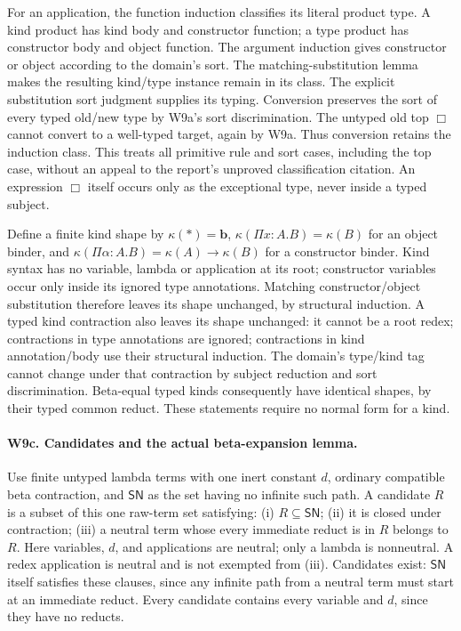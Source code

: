 For an application, the function induction classifies its literal
product type. A kind product has kind body and constructor function;
a type product has constructor body and object function. The argument
induction gives constructor or object according to the domain's sort.
The matching-substitution lemma makes the resulting kind/type instance
remain in its class. The explicit substitution sort judgment supplies
its typing. Conversion preserves the sort of every typed old/new type
by W9a's sort discrimination. The untyped old top \(\Box\) cannot
convert to a well-typed target, again by W9a. Thus conversion retains
the induction class. This treats all primitive rule and sort cases,
including the top case, without an appeal to the report's unproved
classification citation. An expression \(\Box\) itself occurs only
as the exceptional type, never inside a typed subject.

Define a finite kind shape by
\(\kappa(\ast)=\mathbf b\),
\(\kappa(\Pi x:A.B)=\kappa(B)\) for an object binder, and
\(\kappa(\Pi\alpha:A.B)=\kappa(A)\to\kappa(B)\) for a constructor
binder. Kind syntax has no variable, lambda or application at its root;
constructor variables occur only inside its ignored type annotations.
Matching constructor/object substitution therefore leaves its shape
unchanged, by structural induction. A typed kind contraction also leaves
its shape unchanged: it cannot be a root redex; contractions in type
annotations are ignored; contractions in kind annotation/body use their
structural induction. The domain's type/kind tag cannot change under
that contraction by subject reduction and sort discrimination.
Beta-equal typed kinds consequently have identical shapes, by their
typed common reduct. These statements require no normal form for a kind.

\paragraph{W9c. Candidates and the actual beta-expansion lemma.}
Use finite untyped lambda terms with one inert constant \(d\), ordinary
compatible beta contraction, and \(\mathsf{SN}\) as the set having no
infinite such path. A candidate \(R\) is a subset of this one raw-term
set satisfying: (i) \(R\subseteq\mathsf{SN}\); (ii) it is closed
under contraction; (iii) a neutral term whose every immediate reduct is
in \(R\) belongs to \(R\). Here variables, \(d\), and applications
are neutral; only a lambda is nonneutral. A redex application is neutral
and is not exempted from (iii). Candidates exist: \(\mathsf{SN}\)
itself satisfies these clauses, since any infinite path from a neutral
term must start at an immediate reduct. Every candidate contains every
variable and \(d\), since they have no reducts.

